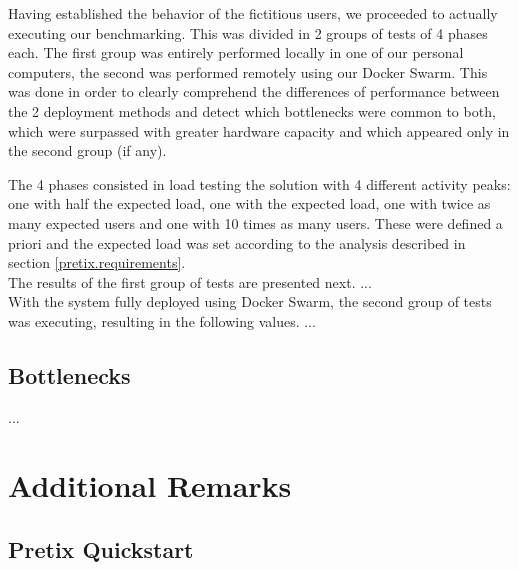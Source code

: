 \documentclass[12pt]{article}
\begin{document}

Having established the behavior of the fictitious users, we proceeded to actually executing our benchmarking.
This was divided in 2 groups of tests of 4 phases each.
The first group was entirely performed locally in one of our personal computers, the second was performed remotely using our Docker Swarm.
This was done in order to clearly comprehend the differences of performance between the 2 deployment methods and detect which bottlenecks were common to both, 
which were surpassed with greater hardware capacity and which appeared only in the second group (if any).

The 4 phases consisted in load testing the solution with 4 different activity peaks: one with half the expected load, one with the expected load, one with 
twice as many expected users and one with 10 times as many users.
These were defined a priori and the expected load was set according to the analysis described in section \ref{pretix.requirements}. \\

The results of the first group of tests are presented next.
... \\











With the system fully deployed using Docker Swarm, the second group of tests was executing, resulting in the following values.
... 

\subsection{Bottlenecks} \label{performance.bottlenecks} %


...

\newpage
\section{Additional Remarks} \label{remarks} %

\subsection{Pretix Quickstart} \label{remarks.quickstart} %
\end{document}
